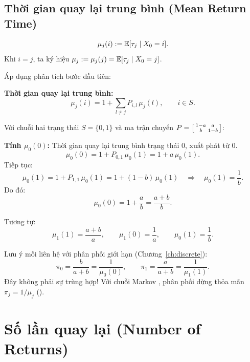 \subsection{Thời gian quay lại trung bình (Mean Return Time)}

\begin{dinhnghia}
\[
  \mu_j(i) := \mathbb{E}[\tau_j \mid X_0 = i].
\]
Khi $i = j$, ta ký hiệu $\mu_j := \mu_j(j) = \mathbb{E}[\tau_j \mid X_0 = j]$.
\end{dinhnghia}

Áp dụng phân tích bước đầu tiên:

\begin{congthuc}
\textbf{Thời gian quay lại trung bình:}
\[
  \boxed{
    \mu_j(i) = 1 + \sum_{l \neq j} P_{i,l}\, \mu_j(l), \qquad i \in S.
  }
\]
\end{congthuc}

\begin{example}
\label{ex:two-state-return}
Với chuỗi hai trạng thái $S = \{0,1\}$ và ma trận chuyển
$P = \begin{bsmallmatrix} 1-a & a \\ b & 1-b \end{bsmallmatrix}$:

\textbf{Tính $\mu_0(0)$:} Thời gian quay lại trung bình trạng thái $0$, xuất phát từ $0$.
\[
  \mu_0(0) = 1 + P_{0,1}\, \mu_0(1) = 1 + a\, \mu_0(1).
\]
Tiếp tục:
\[
  \mu_0(1) = 1 + P_{1,1}\, \mu_0(1) = 1 + (1-b)\, \mu_0(1)
  \quad\Longrightarrow\quad
  \mu_0(1) = \frac{1}{b}.
\]
Do đó:
\[
  \mu_0(0) = 1 + \frac{a}{b} = \frac{a + b}{b}.
\]

Tương tự:
\[
  \mu_1(1) = \frac{a + b}{a}, \qquad
  \mu_1(0) = \frac{1}{a}, \qquad
  \mu_0(1) = \frac{1}{b}.
\]

\begin{tomtat}
Lưu ý mối liên hệ với phân phối giới hạn (Chương~\ref{ch:discrete}):
\[
  \pi_0 = \frac{b}{a+b} = \frac{1}{\mu_0(0)}, \qquad
  \pi_1 = \frac{a}{a+b} = \frac{1}{\mu_1(1)}.
\]
Đây không phải sự trùng hợp! Với chuỗi Markov , phân phối dừng
thỏa mãn $\pi_j = 1/\mu_j$ ().
\end{tomtat}
\end{example}

\section{Số lần quay lại (Number of Returns)}
\label{sec:number-returns}


